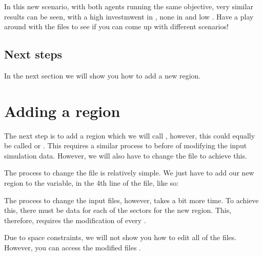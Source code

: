 \documentclass[letterpaper,10pt,english]{sphinxmanual}
\begin{document}
In this new scenario, with both agents running the same objective, very similar results can be seen, with a high investmwent in , none in  and low . Have a play around with the files to see if you can come up with different scenarios!


\subsection{Next steps}
\label{\detokenize{user-guide/add-agent:Next-steps}}
In the next section we will show you how to add a new region.


\section{Adding a region}
\label{\detokenize{user-guide/add-region:Adding-a-region}}\label{\detokenize{user-guide/add-region::doc}}
The next step is to add a region which we will call , however, this could equally be called  or . This requires a similar process to before of modifying the input simulation data. However, we will also have to change the  file to achieve this.

The process to change the  file is relatively simple. We just have to add our new region to the  variable, in the 4th line of the  file, like so:

\begin{sphinxVerbatim}[commandchars=\\\{\}]
  \PYG{p}{[} \PYG{p}{]}
\end{sphinxVerbatim}

The process to change the input files, however, takes a bit more time. To achieve this, there must be data for each of the sectors for the new region. This, therefore, requires the modification of every {\hyperref[\detokenize{inputs/index::doc}]{}}.

Due to space constraints, we will not show you how to edit all of the files. However, you can access the modified files .
\end{document}
